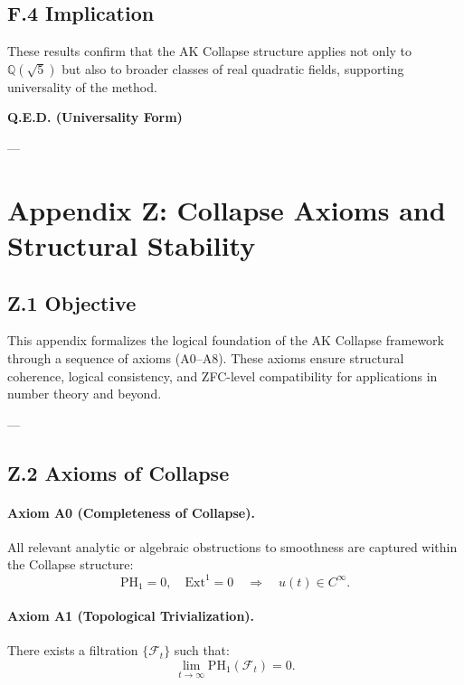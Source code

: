 \documentclass[11pt]{article}
\begin{document}
\subsection*{F.4 Implication}

These results confirm that the AK Collapse structure applies not only to \( \mathbb{Q}(\sqrt{5}) \)  
but also to broader classes of real quadratic fields, supporting universality of the method.

\begin{center}
\LARGE \textbf{Q.E.D. (Universality Form)}
\end{center}


---


\section*{Appendix Z: Collapse Axioms and Structural Stability}

\subsection*{Z.1 Objective}

This appendix formalizes the logical foundation of the AK Collapse framework through a sequence of axioms (A0–A8).  
These axioms ensure structural coherence, logical consistency, and ZFC-level compatibility for applications in number theory and beyond.

---

\subsection*{Z.2 Axioms of Collapse}

\paragraph{Axiom A0 (Completeness of Collapse).}  
All relevant analytic or algebraic obstructions to smoothness are captured within the Collapse structure:
\[
\mathrm{PH}_1 = 0, \quad \mathrm{Ext}^1 = 0 \quad \Longrightarrow \quad u(t) \in C^\infty.
\]

\paragraph{Axiom A1 (Topological Trivialization).}  
There exists a filtration \( \{ \mathcal{F}_t \} \) such that:
\[
\lim_{t \to \infty} \mathrm{PH}_1(\mathcal{F}_t) = 0.
\]
\end{document}
